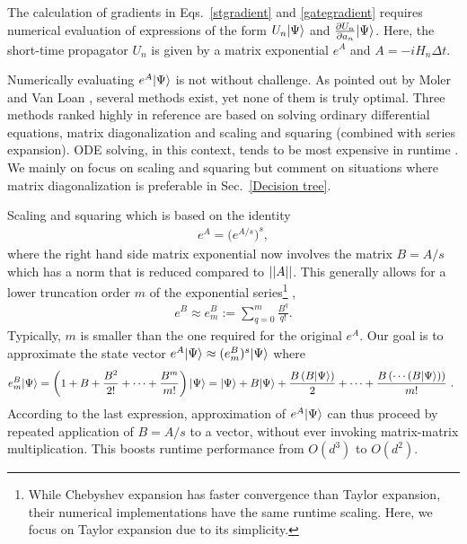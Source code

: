 The calculation of gradients in Eqs.\ \eqref{stgradient} and \eqref{gategradient} requires numerical evaluation of expressions of the form $U_n|\Psi\rangle$  and $\frac{\partial U_n}{\partial a_n} |\Psi\rangle$. 
Here, the short-time propagator $U_n$ is given by a matrix exponential $e^A$ and $A=-iH_n\Delta t$. 

Numerically evaluating  $e^A|\Psi\rangle$ is not without challenge. As pointed out by Moler and Van Loan \cite{expmoler2003nineteen}, several methods exist, yet none of them is truly optimal. Three methods ranked highly in reference \cite{expmoler2003nineteen} are based on solving ordinary differential equations, matrix diagonalization and scaling and squaring (combined with series expansion). ODE solving, in this context, tends to be most expensive in runtime \cite{semiadgoerz2022quantum}. We mainly on focus on scaling and squaring but comment on situations where matrix diagonalization is preferable in Sec.\ \ref{Decision tree}. 

Scaling and squaring \cite{codenotti1992error} which is based on the identity
\begin{align}
\label{scaling squaring equation}
   e^A=\big(e^{A/s}\big)^s,
\end{align}
where the right hand side matrix exponential now involves the matrix $B=A/s$ which has a norm that is reduced compared to $\left|\left|A\right|\right|$. This generally allows for a lower truncation order $m $ of the exponential series\footnote{While Chebyshev expansion has faster convergence than Taylor expansion, their numerical implementations have the same runtime scaling. Here, we focus on Taylor expansion due to its simplicity.} , 
\begin{align}
\label{eBm equation}
    e^B\approx e^B_m:=\sum_{q=0}^m\frac{ B^q}{q!}.
\end{align}
Typically, $m$ is smaller than the one required for the original $e^A$.
Our goal is to approximate the state vector $e^A |\Psi\rangle\approx (e^B_m)^s|\Psi\rangle$ where 
\begin{equation}
\label{eBmpsi}
   e^B_m|\Psi\rangle= \left(1+B+\frac{B^2}{2!}+\cdots+\frac{B^m}{m!}\right)|\Psi\rangle\\\nonumber
   =|\Psi\rangle+B|\Psi\rangle+\frac{B\left(B|\Psi\rangle\right)}{2}+\cdots+\frac{B\left(\cdots \left(B|\Psi\rangle\right)\right)}{m!}\text{   . }
\end{equation}
According to the last expression, approximation of $e^A|\Psi\rangle$ can thus proceed by repeated application of $B=A/s$ to a vector, without ever invoking matrix-matrix multiplication. This boosts runtime performance from $O(d^3)$ to $O(d^2)$.

